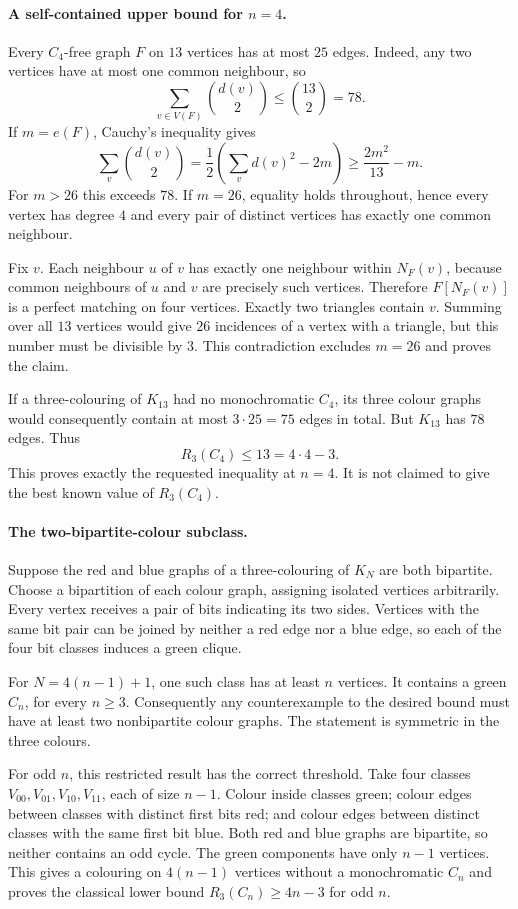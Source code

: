 \paragraph{A self-contained upper bound for $n=4$.}
Every $C_4$-free graph $F$ on $13$ vertices has at most $25$ edges. Indeed, any two vertices have at most one common neighbour, so
\[
\sum_{v\in V(F)}\binom{d(v)}2\le\binom{13}2=78.
\tag{1}
\]
If $m=e(F)$, Cauchy's inequality gives
\[
\sum_v\binom{d(v)}2
=\frac12\left(\sum_v d(v)^2-2m\right)
\ge\frac{2m^2}{13}-m.
\]
For $m>26$ this exceeds $78$. If $m=26$, equality holds throughout, hence every vertex has degree $4$ and every pair of distinct vertices has exactly one common neighbour.

Fix $v$. Each neighbour $u$ of $v$ has exactly one neighbour within $N_F(v)$, because common neighbours of $u$ and $v$ are precisely such vertices. Therefore $F[N_F(v)]$ is a perfect matching on four vertices. Exactly two triangles contain $v$. Summing over all $13$ vertices would give $26$ incidences of a vertex with a triangle, but this number must be divisible by $3$. This contradiction excludes $m=26$ and proves the claim.

If a three-colouring of $K_{13}$ had no monochromatic $C_4$, its three colour graphs would consequently contain at most $3\cdot25=75$ edges in total. But $K_{13}$ has $78$ edges. Thus
\[
R_3(C_4)\le13=4\cdot4-3.
\]
This proves exactly the requested inequality at $n=4$. It is not claimed to give the best known value of $R_3(C_4)$.

\paragraph{The two-bipartite-colour subclass.}
Suppose the red and blue graphs of a three-colouring of $K_N$ are both bipartite. Choose a bipartition of each colour graph, assigning isolated vertices arbitrarily. Every vertex receives a pair of bits indicating its two sides. Vertices with the same bit pair can be joined by neither a red edge nor a blue edge, so each of the four bit classes induces a green clique.

For $N=4(n-1)+1$, one such class has at least $n$ vertices. It contains a green $C_n$, for every $n\ge3$. Consequently any counterexample to the desired bound must have at least two nonbipartite colour graphs. The statement is symmetric in the three colours.

For odd $n$, this restricted result has the correct threshold. Take four classes $V_{00},V_{01},V_{10},V_{11}$, each of size $n-1$. Colour inside classes green; colour edges between classes with distinct first bits red; and colour edges between distinct classes with the same first bit blue. Both red and blue graphs are bipartite, so neither contains an odd cycle. The green components have only $n-1$ vertices. This gives a colouring on $4(n-1)$ vertices without a monochromatic $C_n$ and proves the classical lower bound $R_3(C_n)\ge4n-3$ for odd $n$.

